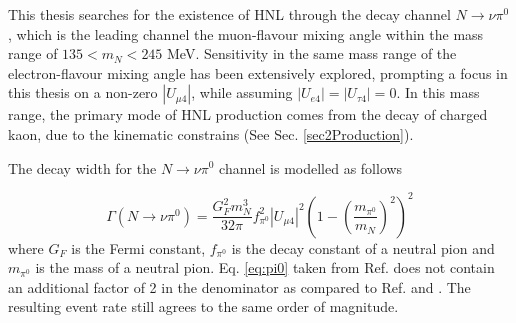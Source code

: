 This thesis searches for the existence of HNL through the decay channel $N\rightarrow\nu \pi^{0}$, which is the leading channel the muon-flavour mixing angle within the mass range of $ 135 < m_{N} < 245 $ MeV.
Sensitivity in the same mass range of the electron-flavour mixing angle has been extensively explored, prompting a focus in this thesis on a non-zero $|U_{\mu4}|$, while assuming $|U_{e4}| = |U_{\tau4}| = 0$.  
In this mass range, the primary mode of HNL production comes from  the decay of charged kaon, due to the kinematic constrains (See Sec. \ref{sec2Production}). 

The decay width for the $N\rightarrow\nu \pi^{0}$ channel is modelled as follows \cite{HNLZarko}

\begin{equation}
	\Gamma(N\rightarrow \nu \pi^{0}) = \frac{G_{F}^{2}m_{N}^{3}}{32\pi}f^{2}_{\pi^{0}}|U_{\mu4}|^{2}\left(1-\left(\frac{m_{\pi^{0}}}{m_{N}}\right)^{2}\right)^{2}
\label{eq:pi0}
\end{equation}
where $G_{F}$ is the Fermi constant, $f_{\pi^{0}}$ is the decay constant of a neutral pion and $m_{\pi^{0}}$ is the mass of a neutral pion.
Eq. \ref{eq:pi0} taken from Ref. \cite{HNLZarko} does not contain an additional factor of 2 in the denominator as compared to Ref. \cite{SBNHNL} and \cite{HNLBin}.
The resulting event rate still agrees to the same order of magnitude.

